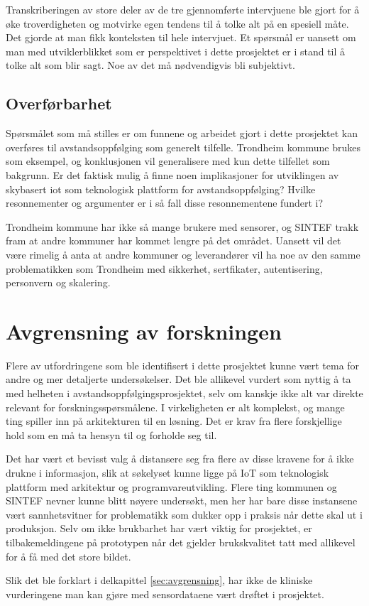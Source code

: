 Transkriberingen av store deler av de tre gjennomførte intervjuene ble gjort for å øke troverdigheten og motvirke egen
tendens til å tolke alt på en spesiell måte. Det gjorde at man fikk konteksten til hele intervjuet. Et spørsmål
er uansett om man med utviklerblikket som er perspektivet i dette prosjektet er i stand til å tolke alt som blir sagt.
Noe av det må nødvendigvis bli subjektivt.

\subsection{Overførbarhet}
Spørsmålet som må stilles er om funnene og arbeidet gjort i dette prosjektet kan overføres til avstandsoppfølging som generelt tilfelle.
Trondheim kommune brukes som eksempel, og konklusjonen vil generalisere med kun dette tilfellet som bakgrunn.
Er det faktisk mulig å finne noen implikasjoner for utviklingen av skybasert \gls{iot} som teknologisk plattform for avstandsoppfølging?
Hvilke resonnementer og argumenter er i så fall disse resonnementene fundert i?

Trondheim kommune har ikke så mange brukere med sensorer, og SINTEF trakk fram at andre kommuner har kommet lengre på det området. Uansett
vil det være rimelig å anta at andre kommuner og leverandører vil ha noe av den samme problematikken som Trondheim med sikkerhet, sertfikater, autentisering,
personvern og skalering.

\section{Avgrensning av forskningen}
Flere av utfordringene som ble identifisert i dette prosjektet kunne vært tema for andre og mer detaljerte undersøkelser. Det ble allikevel
vurdert som nyttig å ta med helheten i avstandsoppfølgingsprosjektet, selv om kanskje ikke alt var direkte relevant for forskningsspørsmålene.
I virkeligheten er alt komplekst, og mange ting spiller inn på arkitekturen til en løsning. Det er krav fra flere forskjellige hold som en må ta hensyn til
og forholde seg til.

Det har vært et bevisst valg å distansere seg fra flere av disse kravene for å ikke drukne i informasjon, slik at søkelyset kunne ligge på IoT som
teknologisk plattform med arkitektur og programvareutvikling. Flere ting kommunen og SINTEF nevner kunne blitt nøyere undersøkt,
men her har bare disse instansene vært sannhetsvitner for problematikk
som dukker opp i praksis når dette skal ut i produksjon. Selv om ikke brukbarhet har vært viktig for prosjektet, er tilbakemeldingene på prototypen når det gjelder
brukskvalitet tatt med allikevel for å få med det store bildet.

Slik det ble forklart i delkapittel \ref{sec:avgrensning}, har ikke de kliniske vurderingene man kan gjøre med sensordataene vært drøftet
i prosjektet.
